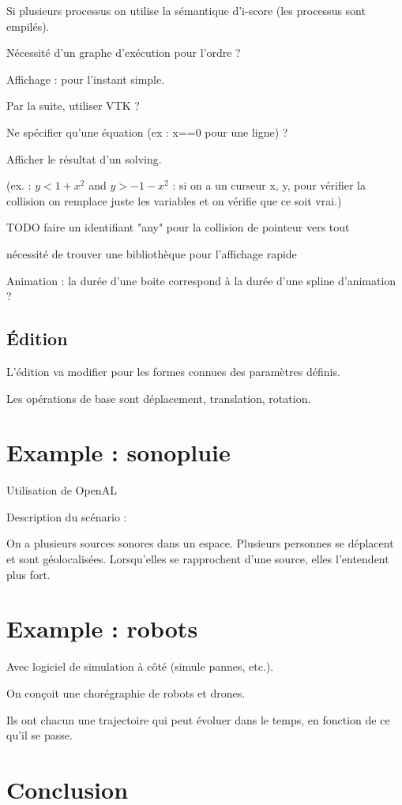\documentclass[french]{article}
\begin{document}
Si plusieurs processus on utilise la sémantique d'i-score (les processus sont empilés).

Nécessité d'un graphe d'exécution pour l'ordre ?

Affichage : pour l'instant simple. 

Par la suite, utiliser VTK ?

Ne spécifier qu'une équation (ex : x==0 pour une ligne) ?

Afficher le résultat d'un solving.

(ex. : $y < 1 + x^2$ and $y > -1 -x^2$ : si on a un curseur x, y, pour vérifier la collision on remplace juste les variables et on vérifie que ce soit vrai.)

TODO faire un identifiant "any" pour la collision de pointeur vers tout

nécessité de trouver une bibliothèque pour l'affichage rapide
 
Animation : la durée d'une boite correspond à la durée d'une spline d'animation ?
 
\subsection{Édition}
L'édition va modifier pour les formes connues des paramètres définis.

Les opérations de base sont déplacement, translation, rotation.



\section{Example : sonopluie}
Utilisation de OpenAL

Description du scénario : 

On a plusieurs sources sonores dans un espace.
Plusieurs personnes se déplacent et sont géolocalisées.
Lorsqu'elles se rapprochent d'une source, elles l'entendent plus fort.

\section{Example : robots}
Avec logiciel de simulation à côté (simule pannes, etc.).

On conçoit une chorégraphie de robots et drones.

Ils ont chacun une trajectoire qui peut évoluer dans le temps, en fonction de ce qu'il se passe.
\section{Conclusion}
\end{document}
